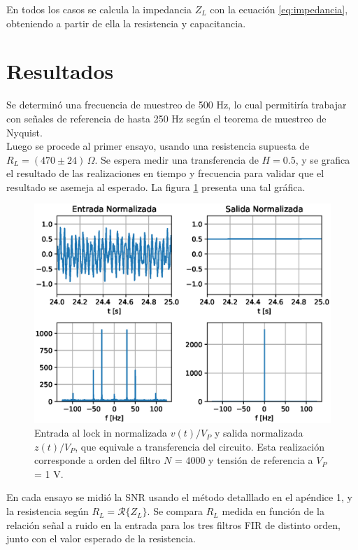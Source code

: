 \documentclass[11pt,a4paper]{extarticle}
\begin{document}
\begin{multicols}{2}
En todos los casos se calcula la impedancia $Z_L$ con la ecuación \ref{eq:impedancia}, obteniendo a partir de ella la resistencia y capacitancia.

\section{Resultados}

Se determinó una frecuencia de muestreo de 500 Hz, lo cual permitiría trabajar con señales de referencia de hasta 250 Hz 
según el teorema de muestreo de Nyquist.\\

Luego se procede al primer ensayo, usando una resistencia supuesta de $R_L = (470 \pm 24)\,\Omega$.
Se espera medir una transferencia de $H = 0.5$, y se grafica el resultado de las realizaciones en tiempo y frecuencia para validar que el resultado se asemeja al esperado. La figura \ref{fig:in_out} presenta una tal gráfica.\\

\begin{figure}[H]
	\centering
	\includegraphics[width=\linewidth]{Images/in_out.eps}
	\caption{Entrada al lock in normalizada $v(t)/V_P$ y salida normalizada $z(t)/V_P$, 
	que equivale a transferencia del circuito. Esta realización corresponde a orden del filtro $N$ = 4000 y tensión de referencia a $V_P$ = 1 V.}
	\label{fig:in_out}
\end{figure}

En cada ensayo se midió la SNR usando el método detalllado en el apéndice 1, y la resistencia según $R_L = \mathcal{R}\{Z_L\}$.
Se compara $R_L$ medida en función de la relación señal a ruido en la entrada para los tres 
filtros FIR de distinto orden, junto con el valor esperado de la resistencia.\\


\end{multicols}
\end{document}
